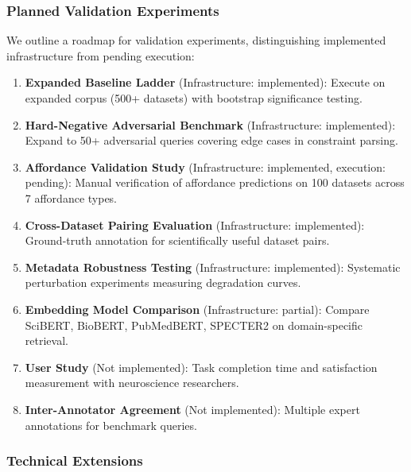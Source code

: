 \documentclass{article}
\theoremstyle{definition}
\begin{document}
\subsubsection{Planned Validation Experiments}

We outline a roadmap for validation experiments, distinguishing implemented infrastructure from pending execution:

\begin{enumerate}
    \item \textbf{Expanded Baseline Ladder} (Infrastructure: implemented): Execute on expanded corpus (500+ datasets) with bootstrap significance testing.

    \item \textbf{Hard-Negative Adversarial Benchmark} (Infrastructure: implemented): Expand to 50+ adversarial queries covering edge cases in constraint parsing.

    \item \textbf{Affordance Validation Study} (Infrastructure: implemented, execution: pending): Manual verification of affordance predictions on 100 datasets across 7 affordance types.

    \item \textbf{Cross-Dataset Pairing Evaluation} (Infrastructure: implemented): Ground-truth annotation for scientifically useful dataset pairs.

    \item \textbf{Metadata Robustness Testing} (Infrastructure: implemented): Systematic perturbation experiments measuring degradation curves.

    \item \textbf{Embedding Model Comparison} (Infrastructure: partial): Compare SciBERT, BioBERT, PubMedBERT, SPECTER2 on domain-specific retrieval.

    \item \textbf{User Study} (Not implemented): Task completion time and satisfaction measurement with neuroscience researchers.

    \item \textbf{Inter-Annotator Agreement} (Not implemented): Multiple expert annotations for benchmark queries.
\end{enumerate}

\subsubsection{Technical Extensions}
\end{document}
